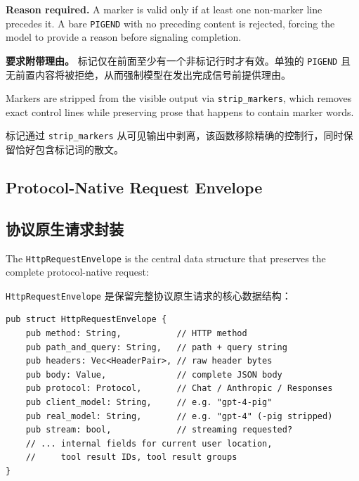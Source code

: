 \textbf{Reason required.} A marker is valid only if at least one non-marker line precedes it. A bare \texttt{PIGEND} with no preceding content is rejected, forcing the model to provide a reason before signaling completion.
\begin{chinese}
\textbf{要求附带理由。} 标记仅在前面至少有一个非标记行时才有效。单独的 \texttt{PIGEND} 且无前置内容将被拒绝，从而强制模型在发出完成信号前提供理由。
\end{chinese}

Markers are stripped from the visible output via \texttt{strip\_markers}, which removes exact control lines while preserving prose that happens to contain marker words.
\begin{chinese}
标记通过 \texttt{strip\_markers} 从可见输出中剥离，该函数移除精确的控制行，同时保留恰好包含标记词的散文。
\end{chinese}

\subsection{Protocol-Native Request Envelope}
\label{sec:envelope}
\begin{chinese}
\subsection{协议原生请求封装}
\end{chinese}

The \texttt{HttpRequestEnvelope} is the central data structure that preserves the complete protocol-native request:
\begin{chinese}
\texttt{HttpRequestEnvelope} 是保留完整协议原生请求的核心数据结构：
\end{chinese}

\begin{lstlisting}
pub struct HttpRequestEnvelope {
    pub method: String,           // HTTP method
    pub path_and_query: String,   // path + query string
    pub headers: Vec<HeaderPair>, // raw header bytes
    pub body: Value,              // complete JSON body
    pub protocol: Protocol,       // Chat / Anthropic / Responses
    pub client_model: String,     // e.g. "gpt-4-pig"
    pub real_model: String,       // e.g. "gpt-4" (-pig stripped)
    pub stream: bool,             // streaming requested?
    // ... internal fields for current user location,
    //     tool result IDs, tool result groups
}
\end{lstlisting}

